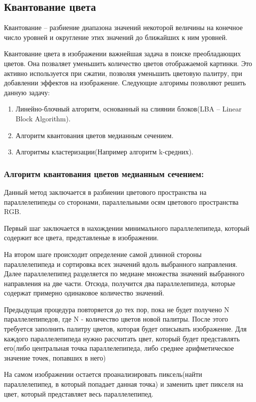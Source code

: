 \subsection{ Квантование цвета}
Квантование -- разбиение диапазона значений некоторой величины на конечное число уровней и округление этих значений до ближайших к ним уровней.

Квантование цвета в изображении важнейшая задача в поиске преобладающих цветов. Она позваляет уменьшить количество цветов отображаемой картинки. Это активно используется при сжатии, позволяя уменьшить цветовую палитру, при добавлении эффектов на изображение. Следующие алгоримы позволяют решить данную задачу:
\begin{enumerate}
	\item Линейно-блочный алгоритм, основанный на слиянии блоков(LBA -- Linear Block Algorithm).
	\item Алгоритм квантования цветов медианным сечением.
	\item Алгоритмы кластеризации(Например алгоритм k-средних).
\end{enumerate}

\subsubsection{ Алгоритм квантования цветов медианным сечением:}
Данный метод заключается в разбиении цветового пространства на параллелепипеды со сторонами, параллельными осям цветового пространства RGB.

Первый шаг заключается в нахождении минимального параллелепипеда, который содержит все цвета, представленые в изображении.

На втором шаге происходит определение самой длинной стороны параллелепипеда и сортировка всех значений вдоль выбранного направления. Далее параллелепипед разделяется по медиане множества значений выбранного направления на две части. Отсюда, получится два параллелепипеда, которые содержат примерно одинаковое количество значений. 

Предыдущая процедура повторяется до тех пор, пока не будет получено N параллелепипедов, где N - количество цветов новой палитры. После этого требуется заполнить палитру цветов, которая будет описывать изображение. Для каждого параллелепипеда нужно рассчитать цвет, который будет представлять его(либо центральная точка параллелепипеда, либо среднее арифметическое значение точек, попавших в него)

На самом изображении остается проанализировать пиксель(найти параллелепипед, в который попадает данная точка) и заменить цвет пикселя на цвет, который представляет весь параллелепипед.

